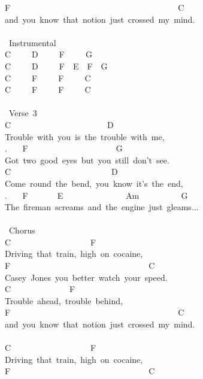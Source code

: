 {F\ \ \ \ \ \ \ \ \ \ \ \ \ \ \ \ \ \ \ \ \ \ \ \ \ \ \ \ \ \ \ \ \ \ \ \ \ \ \ \ C\\
and\ you\ know\ that\ notion\ just\ crossed\ my\ mind.\\
\\
\lbrack\ Instrumental\rbrack\\
C\ \ \ \ \ D\ \ \ \ \ F\ \ \ \ \ G\\
C\ \ \ \ \ D\ \ \ \ \ F\ \ E\ \ F\ \ G\\
C\ \ \ \ \ F\ \ \ \ \ F\ \ \ \ \ C\\
C\ \ \ \ \ F\ \ \ \ \ F\ \ \ \ \ C\\
\\
\lbrack\ Verse\ 3\rbrack\\
C\ \ \ \ \ \ \ \ \ \ \ \ \ \ \ \ \ \ \ \ \ \ \ D\\
Trouble\ with\ you\ is\ the\ trouble\ with\ me,\\
. \ \ \ F\ \ \ \ \ \ \ \ \ \ \ \ \ \ \ \ \ \ \ \ \ G\\
Got\ two\ good\ eyes\ but\ you\ still\ don't\ see.\\
C\ \ \ \ \ \ \ \ \ \ \ \ \ \ \ \ \ \ \ \ \ \ \ \ D\\
Come\ round\ the\ bend,\ you\ know\ it's\ the\ end,\\
. \ \ \ F\ \ \ \ \ \ \ E\ \ \ \ \ \ \ \ \ \ \ \ \ \ \ Am\ \ \ \ \ \ \ \ \ \ G\\
The\ fireman\ screams\ and\ the\ engine\ just\ gleams...\\
\\
\lbrack\ Chorus\rbrack\\
C\ \ \ \ \ \ \ \ \ \ \ \ \ \ \ \ \ \ \ F\\
Driving\ that\ train,\ high\ on\ cocaine,\\
F\ \ \ \ \ \ \ \ \ \ \ \ \ \ \ \ \ \ \ \ \ \ \ \ \ \ \ \ \ \ \ \ \ C\\
Casey\ Jones\ you\ better\ watch\ your\ speed.\\
C\ \ \ \ \ \ \ \ \ \ \ \ \ \ F\\
Trouble\ ahead,\ trouble\ behind,\\
F\ \ \ \ \ \ \ \ \ \ \ \ \ \ \ \ \ \ \ \ \ \ \ \ \ \ \ \ \ \ \ \ \ \ \ \ \ \ \ \ C\\
and\ you\ know\ that\ notion\ just\ crossed\ my\ mind.\\
\\
C\ \ \ \ \ \ \ \ \ \ \ \ \ \ \ \ \ \ \ F\\
Driving\ that\ train,\ high\ on\ cocaine,\\
F\ \ \ \ \ \ \ \ \ \ \ \ \ \ \ \ \ \ \ \ \ \ \ \ \ \ \ \ \ \ \ \ \ C\\
}
